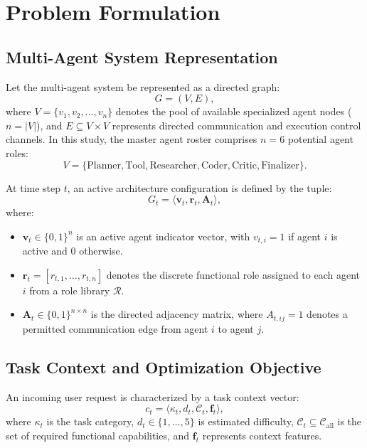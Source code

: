 \documentclass[conference]{IEEEtran}
\begin{document}


\section{Problem Formulation}
\label{sec:problem_formulation}

\subsection{Multi-Agent System Representation}
Let the multi-agent system be represented as a directed graph:
\begin{equation}
G = (V, E),
\end{equation}
where $V = \{v_1, v_2, \dots, v_n\}$ denotes the pool of available specialized agent nodes ($n = |V|$), and $E \subseteq V \times V$ represents directed communication and execution control channels. In this study, the master agent roster comprises $n = 6$ potential agent roles:
\begin{equation}
V = \{\text{Planner}, \text{Tool}, \text{Researcher}, \text{Coder}, \text{Critic}, \text{Finalizer}\}.
\end{equation}

At time step $t$, an active architecture configuration is defined by the tuple:
\begin{equation}
G_t = \langle \mathbf{v}_t, \mathbf{r}_t, \mathbf{A}_t \rangle,
\end{equation}
where:
\begin{itemize}[leftmargin=*]
    \item $\mathbf{v}_t \in \{0, 1\}^n$ is an active agent indicator vector, with $v_{t,i} = 1$ if agent $i$ is active and $0$ otherwise.
    \item $\mathbf{r}_t = [r_{t,1}, \dots, r_{t,n}]$ denotes the discrete functional role assigned to each agent $i$ from a role library $\mathcal{R}$.
    \item $\mathbf{A}_t \in \{0, 1\}^{n \times n}$ is the directed adjacency matrix, where $A_{t,ij} = 1$ denotes a permitted communication edge from agent $i$ to agent $j$.
\end{itemize}

\subsection{Task Context and Optimization Objective}
An incoming user request is characterized by a task context vector:
\begin{equation}
c_t = \langle \kappa_t, d_t, \mathcal{C}_t, \mathbf{f}_t \rangle,
\label{eq:context}
\end{equation}
where $\kappa_t$ is the task category, $d_t \in \{1, \dots, 5\}$ is estimated difficulty, $\mathcal{C}_t \subseteq \mathcal{C}_{\mathrm{all}}$ is the set of required functional capabilities, and $\mathbf{f}_t$ represents context features.
\end{document}
